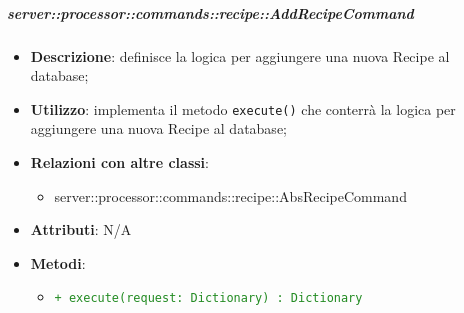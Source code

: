        \subparagraph{server::processor::commands::recipe::AddRecipeCommand} %
        \label{subp:bdsm_app_server_processor_commands_recipe_addrecipecommand}
        \begin{itemize}
          \item \textbf{Descrizione}: definisce la logica per aggiungere una nuova Recipe al database;
          \item \textbf{Utilizzo}: implementa il metodo \texttt{execute()} che conterrà la logica per aggiungere una nuova Recipe al database;
          \item \textbf{Relazioni con altre classi}:
            \begin{itemize}
              \item server::processor::commands::recipe::AbsRecipeCommand
            \end{itemize}
          \item \textbf{Attributi}: N/A
          \item \textbf{Metodi}:
          \begin{itemize}
              \item \textcolor{forestgreen}{\texttt{+ execute(request: Dictionary) : Dictionary}}
          \end{itemize}
        \end{itemize}

